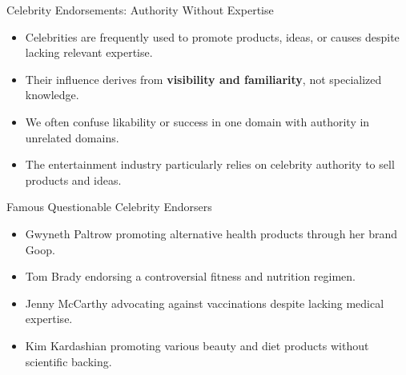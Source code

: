 \documentclass{beamer}
\begin{document}
\begin{frame}{Celebrity Endorsements: Authority Without Expertise}
    \begin{itemize}
        \item Celebrities are frequently used to promote products, ideas, or causes despite lacking relevant expertise.
        \item Their influence derives from \textbf{visibility and familiarity}, not specialized knowledge.
        \item We often confuse likability or success in one domain with authority in unrelated domains.
        \item The entertainment industry particularly relies on celebrity authority to sell products and ideas.
    \end{itemize}
    
    \begin{example}{Famous Questionable Celebrity Endorsers}
        \scriptsize
        \begin{itemize}
            \item Gwyneth Paltrow promoting alternative health products through her brand Goop.
            \item Tom Brady endorsing a controversial fitness and nutrition regimen.
            \item Jenny McCarthy advocating against vaccinations despite lacking medical expertise.
            \item Kim Kardashian promoting various beauty and diet products without scientific backing.
        \end{itemize}
    \end{example}
\end{frame}
\end{document}
